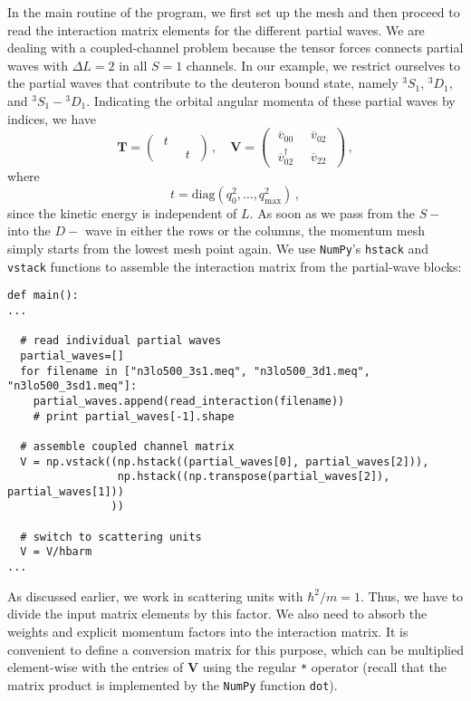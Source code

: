 In the main routine of the program, we first set up the mesh and 
then proceed to read the interaction matrix elements for the 
different partial waves.
We are dealing with a coupled-channel problem because
the tensor forces connects partial waves with $\Delta L=2$
in all $S=1$ channels. In our example, we restrict ourselves
to the partial waves that contribute to the deuteron bound
state, namely ${}^3S_1$, ${}^3D_1$,
and ${}^3S_1-{}^3D_1$. Indicating the orbital angular momenta
of these partial waves by indices, we have
\begin{equation}
  \mathbf{T}=
  \begin{pmatrix} 
      \;t\; &   \\
        &  \;t\;
  \end{pmatrix}\,,
  \quad
  \mathbf{V}=
  \begin{pmatrix} 
      \;\overline{v}_{00}\;       &  \;\overline{v}_{02}\; \\
      \;\overline{v}^\dag_{02}\;  &  \;\overline{v}_{22}\;
  \end{pmatrix}\,,
\end{equation}
where 
\begin{equation}
  t = \mathrm{diag}\left(q_0^2,\ldots,q_\text{max}^2\right)\,,
\end{equation}
since the kinetic energy is independent of $L$. As soon as we pass 
from the $S-$ into the $D-$ wave in either the
rows or the columns, the momentum mesh simply starts from the
lowest mesh point again. We use \texttt{NumPy}'s \texttt{hstack} 
and \texttt{vstack} functions to assemble the interaction matrix
from the partial-wave blocks:

\begin{lstlisting}
def main():
...
  
  # read individual partial waves
  partial_waves=[]
  for filename in ["n3lo500_3s1.meq", "n3lo500_3d1.meq", "n3lo500_3sd1.meq"]:
    partial_waves.append(read_interaction(filename))
    # print partial_waves[-1].shape

  # assemble coupled channel matrix
  V = np.vstack((np.hstack((partial_waves[0], partial_waves[2])), 
                 np.hstack((np.transpose(partial_waves[2]), partial_waves[1]))
                ))

  # switch to scattering units
  V = V/hbarm
...
\end{lstlisting}

As discussed earlier, we work in scattering units with $\hbar^2/m=1$. Thus,
we have to divide the input matrix elements by this factor. We also need to
absorb the weights and explicit momentum factors into the interaction matrix.
It is convenient to define a conversion matrix for this purpose, which can
be multiplied element-wise with the entries of $\mathbf{V}$ using the 
regular \texttt{*} operator (recall that the matrix product is implemented
by the \texttt{NumPy} function \texttt{dot}).


